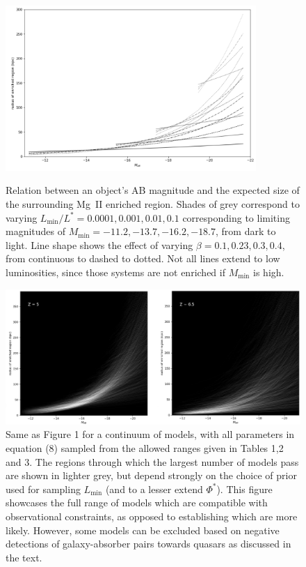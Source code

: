 \documentclass[useAMS,usenatbib]{mn2e}
\newcommand{\magtwo}{Mg~{\small II} }
\begin{document}
\begin{figure}
\includegraphics[width=0.85\textwidth]{plots/MgII_few.png}
\caption{Relation between an object's AB magnitude and the expected size of the surrounding \magtwo enriched region. Shades of grey correspond to varying $L_\text{min}/L^*=0.0001,0.001,0.01,0.1$ corresponding to limiting magnitudes of $M_\text{min} = -11.2, -13.7, -16.2, -18.7$, from dark to light. Line shape shows the effect of varying $\beta=0.1,0.23,0.3,0.4$, from continuous to dashed to dotted. Not all lines extend to low luminosities, since those systems are not  enriched if $M_\text{min}$ is high.\\}
\includegraphics[width=\textwidth]{plots/fig2-all.png}
\caption{Same as Figure 1 for a continuum of models, with all parameters in equation (8) sampled from the allowed ranges given in Tables 1,2 and 3. The regions through which the largest number of models pass are shown in lighter grey, but depend strongly on the choice of prior used for sampling $L_\text{min}$ (and to a lesser extend $\Phi^*$). This figure showcases the full range of models which are compatible with observational constraints, as opposed to establishing which are more likely. However, some models can be excluded based on negative detections of galaxy-absorber pairs towards quasars as discussed in the text.}
\end{figure}
\end{document}
